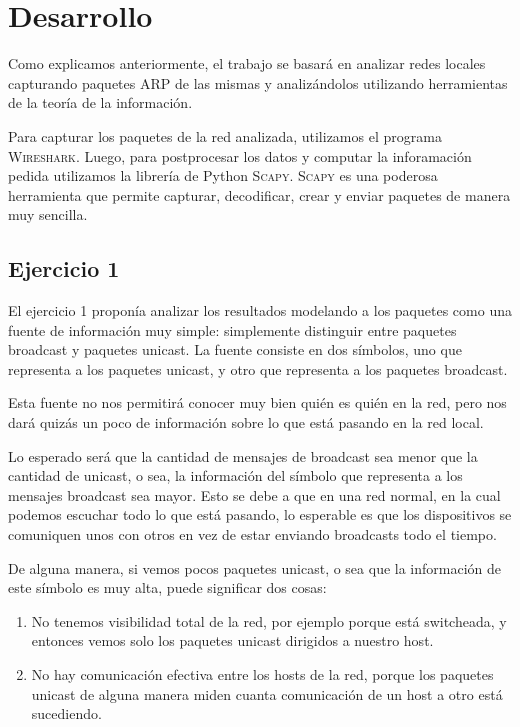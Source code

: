 \section{Desarrollo}

\PARstart Como explicamos anteriormente, el trabajo se basará en analizar redes locales capturando paquetes ARP de las mismas y analizándolos utilizando herramientas de la teoría de la información.

Para capturar los paquetes de la red analizada, utilizamos el programa \textsc{Wireshark}. Luego, para postprocesar los datos y computar la inforamación pedida utilizamos la librería de Python \textsc{Scapy}. \textsc{Scapy} es una poderosa herramienta que permite capturar, decodificar, crear y enviar paquetes de manera muy sencilla.

\subsection{Ejercicio 1}

El ejercicio 1 proponía analizar los resultados modelando a los paquetes como una fuente de información muy simple: simplemente distinguir entre paquetes broadcast y paquetes unicast. La fuente consiste en dos símbolos, uno que representa a los paquetes unicast, y otro que representa a los paquetes broadcast.

Esta fuente no nos permitirá conocer muy bien quién es quién en la red, pero nos dará quizás un poco de información sobre lo que está pasando en la red local.

Lo esperado será que la cantidad de mensajes de broadcast sea menor que la cantidad de unicast, o sea, la información del símbolo que representa a los mensajes broadcast sea mayor. Esto se debe a que en una red normal, en la cual podemos escuchar todo lo que está pasando, lo esperable es que los dispositivos se comuniquen unos con otros en vez de estar enviando broadcasts todo el tiempo.

De alguna manera, si vemos pocos paquetes unicast, o sea que la información de este símbolo es muy alta, puede significar dos cosas:

\begin{enumerate}
  \item No tenemos visibilidad total de la red, por ejemplo porque está switcheada, y entonces vemos solo los paquetes unicast dirigidos a nuestro host.
  \item No hay comunicación efectiva entre los hosts de la red, porque los paquetes unicast de alguna manera miden cuanta comunicación de un host a otro está sucediendo.
\end{enumerate}

